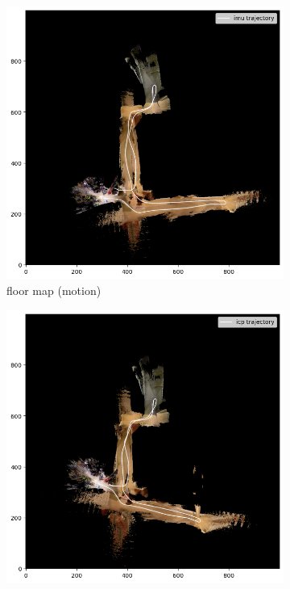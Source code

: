 \documentclass[conference]{IEEEtran}
\begin{document}
\begin{figure}[htbp]
    \begin{subfigure}{0.24\textwidth}
        \includegraphics[width=\linewidth]{../img/fmap_20_imu.png}
        \caption{floor map (motion)}
        \label{fig:fmap_20_imu}
    \end{subfigure}
    \hfill
    \begin{subfigure}{0.24\textwidth}
        \includegraphics[width=\linewidth]{../img/fmap_20_icp.png}

\end{subfigure}
\end{figure}
\end{document}
